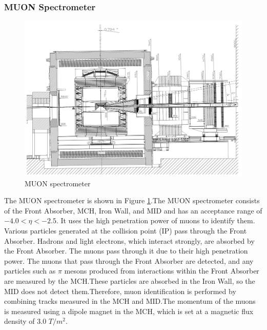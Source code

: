         \subsubsection{MUON Spectrometer}
            \begin{figure}
                \centering
                \includegraphics[keepaspectratio, scale=0.25]{fig/2_2_MUONspectrometer.png}
                \caption{MUON spectrometer}
                \label{MUONspectrometer}
            \end{figure}
            The MUON spectrometer is shown in Figure \ref{MUONspectrometer}.The MUON spectrometer consists of the Front Absorber, MCH, Iron Wall, and MID and has an acceptance range of $-4.0 < \eta < -2.5$. It uses the high penetration power of muons to identify them. Various particles generated at the collision point (IP) pass through the Front Absorber. Hadrons and light electrons, which interact strongly, are absorbed by the Front Absorber. The muons pass through it due to their high penetration power. The muons that pass through the Front Absorber are detected, and any particles such as $\pi$ mesons produced from interactions within the Front Absorber are measured by the MCH.\@ These particles are absorbed in the Iron Wall, so the MID does not detect them.\@ Therefore, muon identification is performed by combining tracks measured in the MCH and MID.\@ The momentum of the muons is measured using a dipole magnet in the MCH, which is set at a magnetic flux density of 3.0 $T/m^2$.\@
